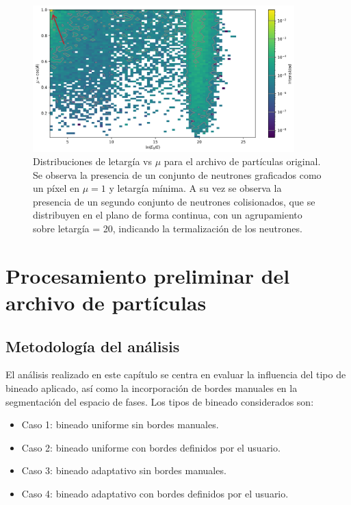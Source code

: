 \begin{figure}[H]
    \centering
    \includegraphics[width=0.9\textwidth]{figs/fig4_3.png}
    \caption{Distribuciones de letargía vs $\mu$ para el archivo de partículas original. Se observa la presencia de un conjunto de neutrones graficados como un píxel en $\mu = 1$ y letargía mínima. A su vez se observa la presencia de un segundo conjunto de neutrones colisionados, que se distribuyen en el plano de forma continua, con un agrupamiento sobre letargía = 20, indicando la termalización de los neutrones.}
    \label{fig:trackfile1_letargia_mu_2}
\end{figure}

\section{Procesamiento preliminar del archivo de partículas}
\subsection{Metodología del análisis}
\label{sec:metodologia-analisis}

El análisis realizado en este capítulo se centra en evaluar la influencia del tipo de bineado aplicado, así como la incorporación de bordes manuales en la segmentación del espacio de fases. Los tipos de bineado considerados son:
\begin{itemize}
    \item Caso 1: bineado uniforme sin bordes manuales.
    \item Caso 2: bineado uniforme con bordes definidos por el usuario.
    \item Caso 3: bineado adaptativo sin bordes manuales.
    \item Caso 4: bineado adaptativo con bordes definidos por el usuario.
\end{itemize}


